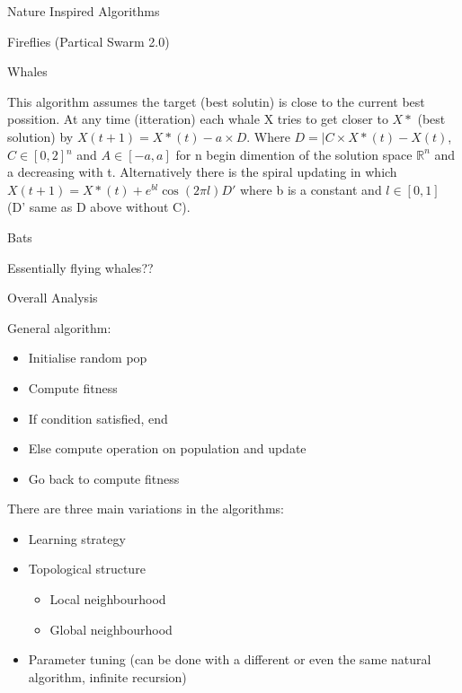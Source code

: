 \documentclass[12pt, letterpaper]{article}
\begin{document}
\begin{section}{Nature Inspired Algorithms}
\begin{subsection}{Fireflies (Partical Swarm 2.0)}
  \end{subsection}

  \begin{subsection}{Whales}

    This algorithm assumes the target (best solutin) is close to the current
    best possition. At any time (itteration) each whale X tries to get closer
    to \(X*\) (best solution) by \(X(t + 1) = X*(t) - a \times D\). Where
    \(D = |C \times X*(t) - X(t)\), \(C \in [0, 2]{}^{n}\) and \(A \in [-a, a]\)
    for n begin dimention of the solution space \(\mathbb{R}^{n}\) and a
    decreasing with t. Alternatively there is the spiral updating in which
    \(X(t + 1) = X*(t) + e^{bl}\cos(2 \pi l)D'\) where b is a constant and
    \(l \in [0, 1]\) (D' same as D above without C).

  \end{subsection}

  \begin{subsection}{Bats}

    Essentially flying whales??

  \end{subsection}

  \begin{subsection}{Overall Analysis}

    General algorithm:
    \begin{itemize}
      \item Initialise random pop
      \item Compute fitness
      \item If condition satisfied, end
      \item Else compute operation on population and update
      \item Go back to compute fitness
    \end{itemize}

    There are three main variations in the algorithms:
    \begin{itemize}
      \item Learning strategy
      \item Topological structure
            \begin{itemize}
              \item Local neighbourhood
              \item Global neighbourhood
            \end{itemize}
      \item Parameter tuning (can be done with a different or even the same
            natural algorithm, infinite recursion)
    \end{itemize}

  \end{subsection}

\end{section}
\end{document}
